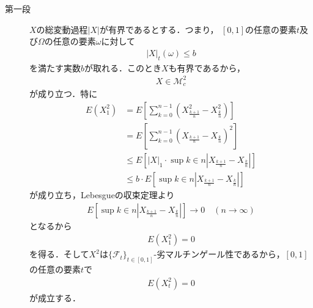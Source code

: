 	\begin{sketch}\mbox{}
		\begin{description}
			\item[第一段]
				$X$の総変動過程$|X|$が有界であるとする．つまり，
				$[0,1]$の任意の要素$t$及び$\Omega$の任意の要素$\omega$に対して
				\begin{align}
					|X|_{t}(\omega) \leq b
				\end{align}
				を満たす実数$b$が取れる．このとき$X$も有界であるから，
				\begin{align}
					X \in \mathscr{M}_{c}^{2}
				\end{align}
				が成り立つ．特に
				\begin{align}
					E\left(X_{1}^{2}\right)
					&= E\left[\sum_{k=0}^{n-1}\left(X_{\frac{k+1}{n}}^{2} - X_{\frac{k}{n}}^{2}\right)\right] \\
					&= E\left[\sum_{k=0}^{n-1}\left(X_{\frac{k+1}{n}} - X_{\frac{k}{n}}\right)^{2}\right] \\
					&\leq E\left[|X|_{1} \cdot \sup{k \in n}{\left|X_{\frac{k+1}{n}} - X_{\frac{k}{n}}\right|}\right] \\
					&\leq b \cdot E\left[\sup{k \in n}{\left|X_{\frac{k+1}{n}} - X_{\frac{k}{n}}\right|}\right]
				\end{align}
				が成り立ち，Lebesgueの収束定理より
				\begin{align}
					E\left[\sup{k \in n}{\left|X_{\frac{k+1}{n}} - X_{\frac{k}{n}}\right|}\right] \longrightarrow 0 \quad (n \longrightarrow \infty)
				\end{align}
				となるから
				\begin{align}
					E\left(X_{1}^{2}\right) = 0
				\end{align}
				を得る．そして$X^{2}$は$\{\mathscr{F}_{t}\}_{t \in [0,1]}$-劣マルチンゲール性であるから，$[0,1]$の任意の要素$t$で
				\begin{align}
					E\left(X_{t}^{2}\right) = 0
				\end{align}
				が成立する．
				

\end{description}
\end{sketch}
